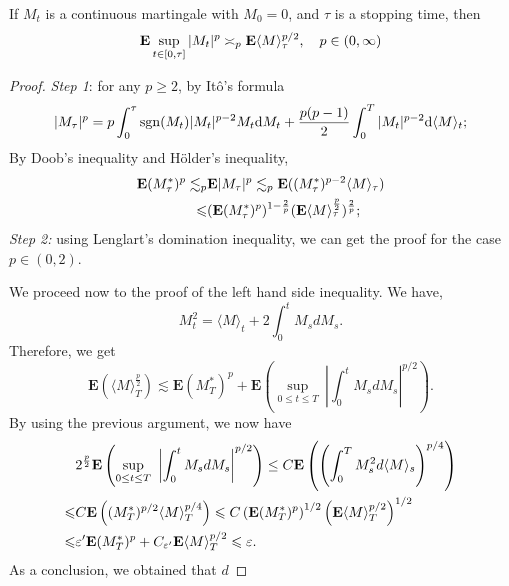 	\begin{theorem}
		If $M_t$ is a continuous martingale with $M_0=0$, and $\tau$ is a stopping time, then 
		\begin{equation}\label{eq:bdg}
			{\mathbf E} \sup_{t\in[0,\tau]} |M_t|^p \asymp_p {\mathbf E} \langle M\rangle_\tau^{p/2}, \quad p\in (0,\infty) 
		\end{equation}
	\end{theorem}
	\begin{proof}
		{\em Step 1}: for any $p\geq 2$, by It\^o's formula 
					\[
					|M_\tau|^p = p \int_0^\tau \mathrm{sgn}(M_t)|M_t|^{p-2} M_t \text{\rm{d}} M_t + \frac{p(p-1)}{2}\int_0^T |M_t|^{p-2} \text{\rm{d}} \langle M \rangle_t ;
					\]
			By Doob's inequality and H\"older's inequality, 
			\[
					\begin{aligned}
						{\mathbf E} (M_\tau^*)^p\lesssim_p& {\mathbf E} |M_\tau|^p  \lesssim_p {\mathbf E} ( (M_\tau^*)^{p-2} \langle M \rangle_\tau)\\
						\leqslant& ({\mathbf E}(M_\tau^*)^p)^{1-\frac{2}{p}} ({\mathbf E} \langle M \rangle_\tau^{\frac{p}{2}} )^{\frac{2}{p}}; 
					\end{aligned}
			\]
			{\em Step 2:} using Lenglart's domination inequality, 
			 we can get the proof for the case $p\in (0,2)$. 
			 
			 We proceed now to the proof of the left hand side inequality. We have,
			 $$
			     M_t^2 =\langle M \rangle_t +2\int_0^t M_s dM_s.
			 $$
			 Therefore, we get
			 $$
			     \mathbf{E} \left( \langle M\rangle_T^{\frac{p}{2} } \right) \lesssim   \mathbf{E} (M_T^*)^p +  \mathbf{E}\left(\sup_{0 \le t \le T}\ \left| \int_0^t M_s dM_s\right|^{p/2} \right) .
			 $$
			 By using the previous argument, we now have
			 \begin{equation*}
			 	\begin{aligned}
			 		&2^{\frac{p}{2}}\mathbf{E}\left(\sup_{0 \le t \le T}\ \left| \int_0^t M_s dM_s\right|^{p/2} \right)  \le C \mathbf{E}\left( \left( \int_0^T M^2_s d\langle M\rangle_s\right)^{p/4} \right)\\
			 		\leqslant  & C \mathbf{E}\left((M_T^*)^{p/2} \langle M \rangle_T^{p/4} \right)
			 		\leqslant C  \left( \mathbf{E} (M_T^*)^{p}\right)^{1/2}  \left( \mathbf{E}  \langle M \rangle_T^{p/2} \right)^{1/2}\\
			 		\leqslant & \varepsilon'  \mathbf{E} (M_T^*)^{p} + C_{\varepsilon'} \mathbf{E}  \langle M \rangle_T^{p/2} \leqslant \varepsilon .
			 	\end{aligned}
			 \end{equation*}			 
			 As a conclusion, we obtained that $d$
	\end{proof}
	
